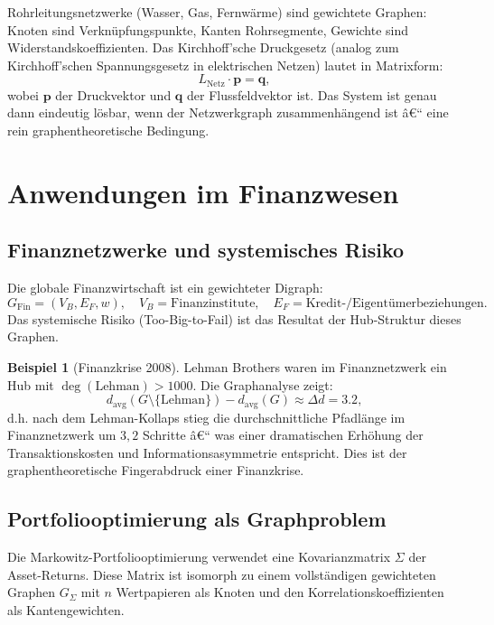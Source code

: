 ﻿\documentclass[12pt,a4paper,twoside]{article}
\theoremstyle{definition}
\newtheorem{beispiel}{Beispiel}[section]
\theoremstyle{plain}
\theoremstyle{remark}
\begin{document}
Rohrleitungsnetzwerke (Wasser, Gas, Fernwärme) sind gewichtete
Graphen: Knoten sind Verknüpfungspunkte, Kanten Rohrsegmente,
Gewichte sind Widerstandskoeffizienten.  Das Kirchhoff'sche
Druckgesetz (analog zum Kirchhoff'schen Spannungsgesetz in
elektrischen Netzen) lautet in Matrixform:
\[
  L_{\text{Netz}} \cdot \mathbf{p} = \mathbf{q},
\]
wobei $\mathbf{p}$ der Druckvektor und $\mathbf{q}$ der
Flussfeldvektor ist.  Das System ist genau dann eindeutig
lösbar, wenn der Netzwerkgraph zusammenhängend ist â€“
eine rein graphentheoretische Bedingung.

\section{Anwendungen im Finanzwesen}
\label{sec:finanz}

\subsection{Finanznetzwerke und systemisches Risiko}

Die globale Finanzwirtschaft ist ein gewichteter Digraph:
\[
  G_{\text{Fin}} = (V_B, E_F, w), \quad
  V_B = \text{Finanzinstitute}, \quad
  E_F = \text{Kredit-/Eigentümerbeziehungen}.
\]
Das systemische Risiko (Too-Big-to-Fail) ist das Resultat
der Hub-Struktur dieses Graphen.

\begin{beispiel}[Finanzkrise 2008]
Lehman Brothers waren im Finanznetzwerk ein Hub mit
$\deg(\text{Lehman}) > 1000$.  Die Graphanalyse zeigt:
\[
  d_{\text{avg}}(G \setminus \{\text{Lehman}\}) -
  d_{\text{avg}}(G) \approx \Delta d = 3.2,
\]
d.h. nach dem Lehman-Kollaps stieg die durchschnittliche
Pfadlänge im Finanznetzwerk um $3{,}2$ Schritte â€“ was einer
dramatischen Erhöhung der Transaktionskosten und
Informationsasymmetrie entspricht.  Dies ist der
graphentheoretische Fingerabdruck einer Finanzkrise.
\end{beispiel}

\subsection{Portfoliooptimierung als Graphproblem}

Die Markowitz-Portfoliooptimierung verwendet eine
Kovarianzmatrix $\Sigma$ der Asset-Returns.  Diese Matrix
ist isomorph zu einem vollständigen gewichteten Graphen
$G_\Sigma$ mit $n$ Wertpapieren als Knoten und den
Korrelationskoeffizienten als Kantengewichten.
\end{document}
